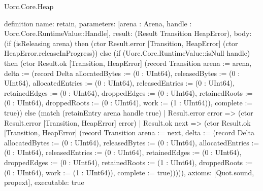 \begin{lexlean}{Uorc.Core.Heap}
\begin{semanticmodule}
definition{
  name: retain,
  parameters: [arena : Arena, handle : Uorc.Core.RuntimeValue::Handle],
  result: (Result Transition HeapError),
  body: (if (isReleasing arena) then (ctor Result.error [Transition, HeapError] (ctor HeapError.releaseInProgress)) else (if (Uorc.Core.RuntimeValue::isNull handle) then (ctor Result.ok [Transition, HeapError] (record Transition {arena := arena, delta := (record Delta {allocatedBytes := (0 : UInt64), releasedBytes := (0 : UInt64), allocatedEntries := (0 : UInt64), releasedEntries := (0 : UInt64), retainedEdges := (0 : UInt64), droppedEdges := (0 : UInt64), retainedRoots := (0 : UInt64), droppedRoots := (0 : UInt64), work := (1 : UInt64)}), complete := true})) else (match (retainEntry arena handle true)
    | Result.error error => (ctor Result.error [Transition, HeapError] error)
    | Result.ok next => (ctor Result.ok [Transition, HeapError] (record Transition {arena := next, delta := (record Delta {allocatedBytes := (0 : UInt64), releasedBytes := (0 : UInt64), allocatedEntries := (0 : UInt64), releasedEntries := (0 : UInt64), retainedEdges := (0 : UInt64), droppedEdges := (0 : UInt64), retainedRoots := (1 : UInt64), droppedRoots := (0 : UInt64), work := (1 : UInt64)}), complete := true}))))),
  axioms: [Quot.sound, propext],
  executable: true
}


\end{semanticmodule}
\end{lexlean}

